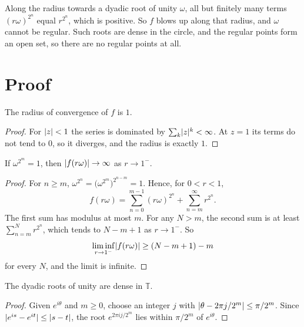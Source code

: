 \documentclass[11pt,a4paper]{article}
\begin{document}
Along the radius towards a dyadic root of unity $\omega$, all but finitely many terms
$(r\omega)^{2^n}$ equal $r^{2^n}$, which is positive. So $f$ blows up along that
radius, and $\omega$ cannot be regular. Such roots are dense in the circle, and the
regular points form an open set, so there are no regular points at all.

\section{Proof}

\begin{lemma}\label{lem:radius}
  The radius of convergence of $f$ is $1$.
\end{lemma}

\begin{proof}
  For $\lvert z\rvert < 1$ the series is dominated by $\sum_k \lvert z\rvert^k < \infty$. At $z = 1$
  its terms do not tend to $0$, so it diverges, and the radius is exactly $1$.
\end{proof}

\begin{lemma}\label{lem:blowup}
  If $\omega^{2^m} = 1$, then $\lvert f(r\omega)\rvert \to \infty$ as $r \to 1^-$.
\end{lemma}

\begin{proof}
  For $n \geq m$, $\omega^{2^n} = \bigl(\omega^{2^m}\bigr)^{2^{n-m}} = 1$. Hence, for
  $0 < r < 1$,
  \[
    f(r\omega) = \sum_{n=0}^{m-1} (r\omega)^{2^n} + \sum_{n=m}^{\infty} r^{2^n} .
  \]
  The first sum has modulus at most $m$. For any $N > m$, the second sum is at least
  $\sum_{n=m}^{N} r^{2^n}$, which tends to $N - m + 1$ as $r \to 1^-$. So
  \[
    \liminf_{r \to 1^-} \lvert f(r\omega)\rvert \geq (N - m + 1) - m
  \]
  for every $N$, and the limit is infinite.
\end{proof}

\begin{lemma}[Density]\label{lem:dense}
  The dyadic roots of unity are dense in $\mathbb{T}$.
\end{lemma}

\begin{proof}
  Given $e^{i\theta}$ and $m \geq 0$, choose an integer $j$ with
  $\lvert\theta - 2\pi j / 2^m\rvert \leq \pi / 2^m$. Since $\lvert e^{is} - e^{it}\rvert \leq \lvert s - t\rvert$,
  the root $e^{2\pi i j / 2^m}$ lies within $\pi / 2^m$ of $e^{i\theta}$.
\end{proof}
\end{document}
